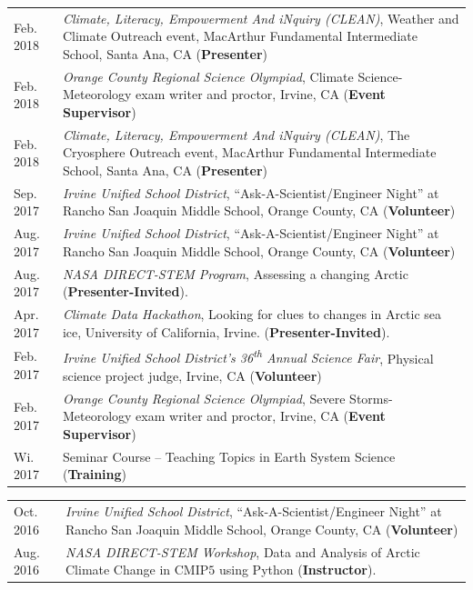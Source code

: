 \documentclass[margin,line,palatino,courier,10pt]{res}
\begin{document}
\begin{resume}
\begin{tabular}{@{}p{0.9in}p{4in}}
Feb. 2018 & \textit{Climate, Literacy, Empowerment And iNquiry (CLEAN)}, Weather and Climate Outreach event, MacArthur Fundamental Intermediate School, Santa Ana, CA (\textbf{Presenter})\\
Feb. 2018 & \textit{Orange County Regional Science Olympiad}, Climate Science-Meteorology exam writer and proctor, Irvine, CA (\textbf{Event Supervisor})\\
Feb. 2018 & \textit{Climate, Literacy, Empowerment And iNquiry (CLEAN)}, The Cryosphere Outreach event, MacArthur Fundamental Intermediate School, Santa Ana, CA (\textbf{Presenter})\\
Sep. 2017 & \textit{Irvine Unified School District}, ``Ask-A-Scientist/Engineer Night'' at Rancho San Joaquin Middle School, Orange County, CA (\textbf{Volunteer})\\
Aug. 2017 & \textit{Irvine Unified School District}, ``Ask-A-Scientist/Engineer Night'' at Rancho San Joaquin Middle School, Orange County, CA (\textbf{Volunteer})\\
Aug. 2017 & \textit{NASA DIRECT-STEM Program}, Assessing a changing Arctic (\textbf{Presenter-Invited}).\\
Apr. 2017 & \textit{Climate Data Hackathon}, Looking for clues to changes in Arctic 
sea ice, University of California, Irvine. (\textbf{Presenter-Invited}).\\
Feb. 2017 & \textit{Irvine Unified School District's 36\textsuperscript{th} Annual Science Fair}, Physical science project judge, Irvine, CA (\textbf{Volunteer})\\
Feb. 2017 & \textit{Orange County Regional Science Olympiad}, Severe Storms-Meteorology exam writer and proctor, Irvine, CA (\textbf{Event Supervisor})\\
Wi. 2017 & Seminar Course -- Teaching Topics in Earth System Science (\textbf{Training})\\
\end{tabular}
\begin{tabular}{@{}p{0.9in}p{4in}}
Oct. 2016 & \textit{Irvine Unified School District}, ``Ask-A-Scientist/Engineer Night'' at Rancho San Joaquin Middle School, Orange County, CA (\textbf{Volunteer})\\
Aug. 2016 & \textit{NASA DIRECT-STEM Workshop}, Data and Analysis of Arctic Climate Change in CMIP$5$ using Python (\textbf{Instructor}).\\
\end{tabular}

\noindent\textcolor{MidnightBlue}{\makebox[\linewidth][r]{\rule{\textwidth}{5pt}}}

\end{resume}
\end{document}
